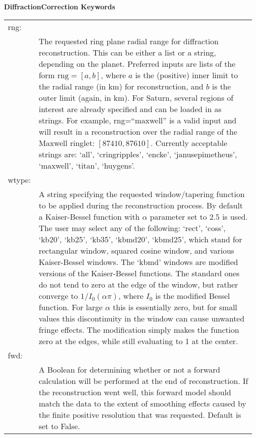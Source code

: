             \textbf{DiffractionCorrection Keywords}
            \begin{table}[H]
                \centering
                \begin{tabular}{lp{5in}}
                    rng:&\\
                    &The requested ring plane radial range for diffraction reconstruction. This
                     can be either a list or a string, depending on
                     the planet. Preferred inputs are lists of the
                     form $\textrm{rng}=[a,b]$,
                     where $a$ is the (positive) inner limit to the radial range (in km) 
                     for reconstruction, and $b$ is the outer limit (again, in km).
                     For Saturn, several regions
                     of interest are already specified and can be
                     loaded in as strings. For example,
                     rng=``maxwell'' is a valid input and will
                     result in a reconstruction over the radial range of the Maxwell ringlet: 
                     $[87410,87610]$. Currently acceptable strings
                     are: `all', `cringripples', `encke',
                     `janusepimetheus', `maxwell', `titan', `huygens'.
                   \\
                    wtype:&\\
                    &A string specifying the requested
                     window/tapering function to be applied during the
                     reconstruction process. By default a
                     Kaiser-Bessel function with $\alpha$ parameter
                     set to 2.5 is used. The user may select any
                     of the following: `rect', `coss',
                     `kb20', `kb25', `kb35', `kbmd20', `kbmd25', which
                     stand for rectangular window,
                     squared cosine window, and various
                     Kaiser-Bessel windows. The `kbmd' windows are
                     modified versions of the Kaiser-Bessel functions.
                     The standard ones do not tend to zero at the
                     edge of the window, but rather converge to
                     $1/I_{0}(\alpha\pi)$, where $I_{0}$ is the
                     modified Bessel function.
                     For large $\alpha$ this is essentially
                     zero, but for small values this discontinuity
                     in the window can cause unwanted fringe effects.
                     The modification simply makes the function
                     zero at the edges, while still evaluating to
                     1 at the center.\\
                    fwd:&\\
                    &A Boolean for determining whether or not
                     a forward calculation will be performed at
                     the end of reconstruction. If the reconstruction
                     went well, this forward model should match the
                     data to the extent of smoothing effects caused
                     by the finite positive resolution that was
                     requested. Default is set to False.\\
    

\end{tabular}
\end{table}
